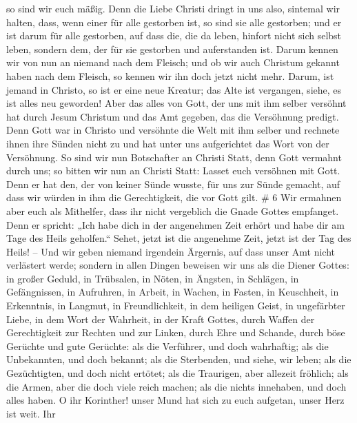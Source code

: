 so sind wir euch mäßig.  Denn die Liebe Christi dringt in
uns also, sintemal wir halten, dass, wenn einer für alle gestorben ist,
so sind sie alle gestorben;  und er ist darum für alle
gestorben, auf dass die, die da leben, hinfort nicht sich selbst leben,
sondern dem, der für sie gestorben und auferstanden ist. 
Darum kennen wir von nun an niemand nach dem Fleisch; und ob wir auch
Christum gekannt haben nach dem Fleisch, so kennen wir ihn doch jetzt
nicht mehr.  Darum, ist jemand in Christo, so ist er eine
neue Kreatur; das Alte ist vergangen, siehe, es ist alles neu geworden!
 Aber das alles von Gott, der uns mit ihm selber versöhnt
hat durch Jesum Christum und das Amt gegeben, das die Versöhnung
predigt.  Denn Gott war in Christo und versöhnte die Welt
mit ihm selber und rechnete ihnen ihre Sünden nicht zu und hat unter uns
aufgerichtet das Wort von der Versöhnung.  So sind wir nun
Botschafter an Christi Statt, denn Gott vermahnt durch uns; so bitten
wir nun an Christi Statt: Lasset euch versöhnen mit Gott. 
Denn er hat den, der von keiner Sünde wusste, für uns zur Sünde gemacht,
auf dass wir würden in ihm die Gerechtigkeit, die vor Gott gilt. \# 6
 Wir ermahnen aber euch als Mithelfer, dass ihr nicht
vergeblich die Gnade Gottes empfanget.  Denn er spricht:
„Ich habe dich in der angenehmen Zeit erhört und habe dir am Tage des
Heils geholfen.`` Sehet, jetzt ist die angenehme Zeit, jetzt ist der Tag
des Heils! --  Und wir geben niemand irgendein Ärgernis, auf
dass unser Amt nicht verlästert werde;  sondern in allen
Dingen beweisen wir uns als die Diener Gottes: in großer Geduld, in
Trübsalen, in Nöten, in Ängsten,  in Schlägen, in
Gefängnissen, in Aufruhren, in Arbeit, in Wachen, in Fasten,
 in Keuschheit, in Erkenntnis, in Langmut, in
Freundlichkeit, in dem heiligen Geist, in ungefärbter Liebe,
 in dem Wort der Wahrheit, in der Kraft Gottes, durch Waffen
der Gerechtigkeit zur Rechten und zur Linken,  durch Ehre
und Schande, durch böse Gerüchte und gute Gerüchte: als die Verführer,
und doch wahrhaftig;  als die Unbekannten, und doch bekannt;
als die Sterbenden, und siehe, wir leben; als die Gezüchtigten, und doch
nicht ertötet;  als die Traurigen, aber allezeit fröhlich;
als die Armen, aber die doch viele reich machen; als die nichts
innehaben, und doch alles haben.  O ihr Korinther! unser
Mund hat sich zu euch aufgetan, unser Herz ist weit.  Ihr

